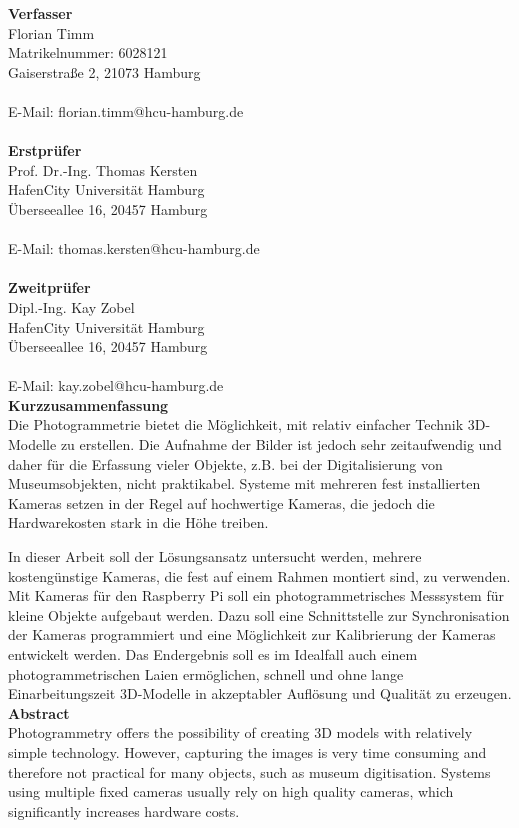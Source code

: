 \documentclass[a4paper,12pt,bibliography=totoc, listof=totoc,titlepage]{scrreprt}
\begin{document}
\vspace{2cm}
\noindent\textbf{\large Verfasser}\\
Florian Timm\\
Matrikelnummer: 6028121\\
Gaiserstraße 2, 21073 Hamburg\\
\\
E-Mail: florian.timm@hcu-hamburg.de\\
\vspace{3cm}\\
\noindent\textbf{\large Erstprüfer}\\
Prof. Dr.-Ing. Thomas Kersten\\
HafenCity Universität Hamburg\\
Überseeallee 16, 20457 Hamburg\\
\\
E-Mail: thomas.kersten@hcu-hamburg.de\\
\vspace{3cm}\\
\textbf{\large Zweitprüfer}\\
Dipl.-Ing. Kay Zobel\\
HafenCity Universität Hamburg\\
Überseeallee 16, 20457 Hamburg\\
\\
E-Mail: kay.zobel@hcu-hamburg.de\\
\newpage
\noindent\textbf{\large Kurzzusammenfassung}\\
Die Photogrammetrie bietet die Möglichkeit, mit relativ einfacher Technik 3D-Modelle zu erstellen. Die Aufnahme der Bilder ist jedoch sehr zeitaufwendig und daher für die Erfassung vieler Objekte, z.B. bei der Digitalisierung von Museumsobjekten, nicht praktikabel. Systeme mit mehreren fest installierten Kameras setzen in der Regel auf hochwertige Kameras, die jedoch die Hardwarekosten stark in die Höhe treiben.

In dieser Arbeit soll der Lösungsansatz untersucht werden, mehrere kostengünstige Kameras, die fest auf einem Rahmen montiert sind, zu verwenden. Mit Kameras für den Raspberry Pi soll ein photogrammetrisches Messsystem für kleine Objekte aufgebaut werden. Dazu soll eine Schnittstelle zur Synchronisation der Kameras programmiert und eine Möglichkeit zur Kalibrierung der Kameras entwickelt werden. Das Endergebnis soll es im Idealfall auch einem photogrammetrischen Laien ermöglichen, schnell und ohne lange Einarbeitungszeit 3D-Modelle in akzeptabler Auflösung und Qualität zu erzeugen.
\vspace{2cm}\\
\noindent\textbf{\large Abstract}\\
Photogrammetry offers the possibility of creating 3D models with relatively simple technology. However, capturing the images is very time consuming and therefore not practical for many objects, such as museum digitisation. Systems using multiple fixed cameras usually rely on high quality cameras, which significantly increases hardware costs.
\end{document}
